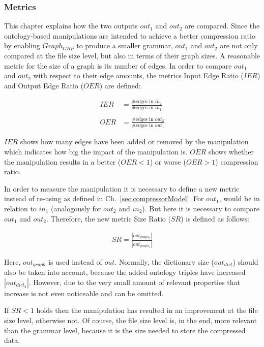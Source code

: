 \subsubsection{Metrics}

This chapter explains how the two outputs $out_1$ and $out_2$ are compared. Since the ontology-based manipulations are intended to achieve a better compression ratio by enabling $Graph_{GRP}$ to produce a smaller grammar, $out_1$ and $out_2$ are not only compared at the file size level, but also in terms of their graph sizes. A reasonable metric for the size of a graph is its number of edges. In order to compare $out_1$ and $out_2$ with respect to their edge amounts, the metrics Input Edge Ratio ($IER$) and Output Edge Ratio ($OER$)  are defined: 

\begin{align*}
IER&=\frac {\text{\#edges in } in_2} {\text{\#edges in  } in_1}
\\\\
OER&=\frac {\text{\#edges in } out_2} {\text{\#edges in } out_1}
 \end{align*}
 
$IER$ shows how many edges have been added or removed by the manipulation which indicates how big the impact of the manipulation is. $OER$  shows whether the manipulation results in a better ($OER<1$) or worse ($OER>1$) compression ratio.

In order to measure the manipulation it is necessary to define a new metric instead of re-using  as defined in Ch.~\ref{sec:compressorModel}. For $out_1$,  would be in relation to $in_1$ (analogously for $out_2$ and $in_2$). But here it is necessary to compare $out_1$ and $out_2$. Therefore, the new metric Size Ratio ($SR$) is defined as follows:

\begin{align*} 
SR=\frac {|out_{graph_2}|} {|out_{graph_1}|}
\end{align*}

Here, $out_{graph}$ is used instead of $out$. Normally, the dictionary size ($out_{dict}$) should also be taken into account, because the added ontology triples have increased $|out_{dict_2}|$. However, due to the very small amount of relevant properties that increase is not even noticeable and can be omitted. 

If $SR<1$ holds then the manipulation has resulted in an improvement at the file size level, otherwise not. Of course, the file size level is, in the end, more relevant than the grammar level, because it is the size needed to store the compressed data.

